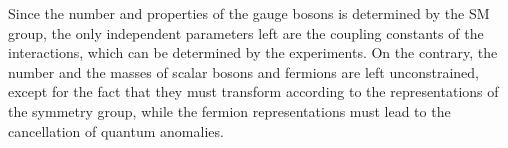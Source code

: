 Since the number and properties of the gauge bosons is determined by the SM group, %
the only independent parameters left are the coupling constants of the interactions, which can be determined by the experiments.
On the contrary, the number and the masses of scalar bosons and fermions are left unconstrained, %
except for the fact that they must transform according to the representations of the symmetry group, %
while the fermion representations must lead to the cancellation of quantum anomalies.

